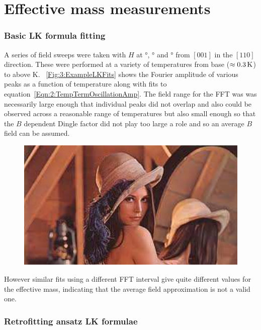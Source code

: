 
\section{Effective mass measurements}


\subsubsection{Basic LK formula fitting}

A series of field sweeps were taken with $H$ at \unit[12]{\degree}, \unit[28]{\degree} and \unit[46]{\degree} from $[001]$ in the $[110]$ direction. These were performed at a variety of temperatures from base ($\approx\unit[0.3]{K}$) to above \unit[2]{K}. \Fig~\ref{Fig:3:ExampleLKFits} shows the Fourier amplitude of various peaks as a function of temperature along with fits to equation~\ref{Eqn:2:TempTermOscillationAmp}. The field range for the FFT was was necessarily large enough that individual peaks did not overlap and also could be observed across a reasonable range of temperatures but also small enough so that the $B$ dependent Dingle factor did not play too large a role and so an average $B$ field can be assumed.
\begin{figure}[h!]
    \begin{center}
        \includegraphics[scale=0.7]{Misc/TODO}
        \caption{}
        \label{Fig:3:SimpleLKFits}
    \end{center}
\end{figure}
However similar fits using a different FFT interval give quite different values for the effective mass, indicating that the average field approximation is not a valid one.

\subsubsection{Retrofitting ansatz LK formulae}

